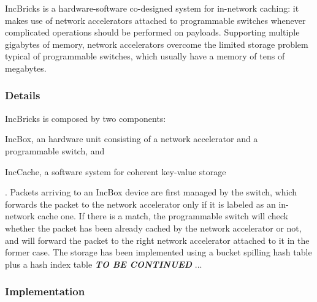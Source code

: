 IncBricks \cite{incbricks} is a hardware-software co-designed system for in-network caching: it makes use of network accelerators attached to programmable switches whenever complicated operations should be performed on payloads.
Supporting multiple gigabytes of memory, network accelerators overcome the limited storage problem typical of programmable switches, which usually have a memory of tens of megabytes.

\subsubsection{Details}
IncBricks \cite{incbricks} is composed by two components:
\begin{mylist}
    \item IncBox, an hardware unit consisting of a network accelerator and a programmable switch, and
    \item IncCache, a software system for coherent key-value storage
\end{mylist}.
Packets arriving to an IncBox device are first managed by the switch, which forwards the packet to the network accelerator only if it is labeled as an in-network cache one.
If there is a match, the programmable switch will check whether the packet has been already cached by the network accelerator or not, and will forward the packet to the right network accelerator attached to it in the former case.
The storage has been implemented using a bucket spilling hash table plus a hash index table
\textbf{\textit{TO BE CONTINUED}} ...

\subsubsection{Implementation}

